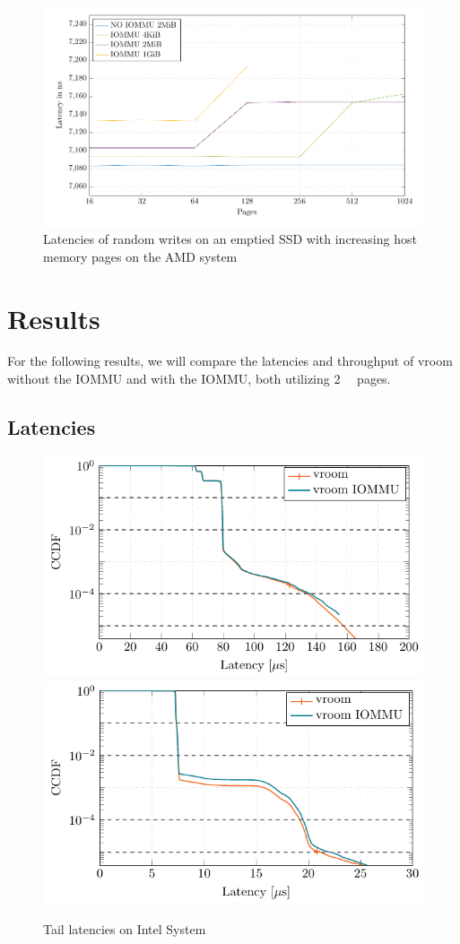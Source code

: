 \begin{figure}[H]
  \centering
  \includegraphics[width=\textwidth]{figures/psmedsepyc}
  \caption{Latencies of random writes on an emptied SSD with increasing host memory pages on the AMD system}
  \label{fig:med-psepyc}
\end{figure}

\section{Results}
For the following results, we will compare the latencies and throughput of vroom without the IOMMU and with the IOMMU, both utilizing \qty{2}{\mebi\byte} pages.

\subsection{Latencies}
\begin{figure}[H]
  \centering
   {\includegraphics[width=.70\textwidth]{figures/lats_ccdf_2MiB_qd1t1_read} \label{fig:ccdf-read}}
   {\includegraphics[width=.70\textwidth]{figures/lats_ccdf_2MiB_qd1t1} \label{fig:ccdf-write}}
  \caption{Tail latencies on Intel System}
  \label{fig:ccdf}
\end{figure}

